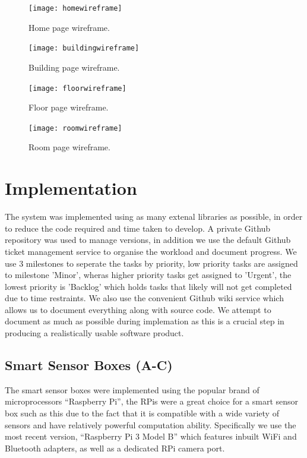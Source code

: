 \documentclass{l4proj}
\begin{document}
\begin{figure}
\centering
\texttt{[image: homewireframe]}
\caption{Home page wireframe.}
\label{fig:homewireframe}
\end{figure}
\begin{figure}
\centering
\texttt{[image: buildingwireframe]}
\caption{Building page wireframe.}
\label{fig:buildingwireframe}
\end{figure}
\begin{figure}
\centering
\texttt{[image: floorwireframe]}
\caption{Floor page wireframe.}
\label{fig:floorwireframe}
\end{figure}
\begin{figure}
\centering
\texttt{[image: roomwireframe]}
\caption{Room page wireframe.}
\label{fig:roomwireframe}
\end{figure}















\chapter{Implementation}
The system was implemented using as many extenal libraries as possible, in order to reduce the code required and time taken to develop. A private Github repository was used to manage versions, in addition we use the default Github ticket management service to organise the workload and document progress. We use 3 milestones to seperate the tasks by priority, low priority tasks are assigned to milestone 'Minor', wheras higher priority tasks get assigned to 'Urgent', the lowest priority is 'Backlog' which holds tasks that likely will not get completed due to time restraints. We also use the convenient Github wiki service which allows us to document  everything along with source code. We attempt to document as much as possible during implemation as this is a crucial step in producing a realistically usable software product. 

\section{Smart Sensor Boxes (A-C)}
The smart sensor boxes were implemented using the popular brand of microprocessors “Raspberry Pi”, the RPis were a great choice for a smart sensor box such as this due to the fact that it is compatible with a wide variety of sensors and have relatively powerful computation ability. Specifically we use the most recent version, “Raspberry Pi 3 Model B” which features inbuilt WiFi and Bluetooth adapters, as well as a dedicated RPi camera port.
\end{document}
